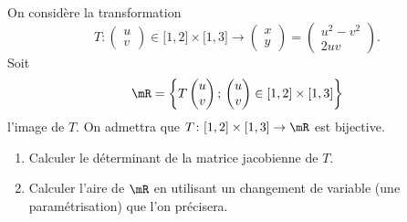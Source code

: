 
\begin{exercice}\label{exoOutilsMath-0119}

    On considère la transformation
    \begin{equation}
        T\colon \begin{pmatrix}
            u    \\ 
            v    
        \end{pmatrix}\in\mathopen[ 1 , 2 \mathclose]\times\mathopen[ 1 , 3 \mathclose]\to \begin{pmatrix}
            x    \\ 
            y    
        \end{pmatrix}=\begin{pmatrix}
            u^2-v^2    \\ 
            2uv    
        \end{pmatrix}.
    \end{equation}
    Soit
    \begin{equation}
        \mR=\left\{ T\begin{pmatrix}
            u    \\ 
            v    
        \end{pmatrix};\,\begin{pmatrix}
            u    \\ 
            v    
        \end{pmatrix}\in\mathopen[ 1 , 2 \mathclose]\times\mathopen[ 1 , 3 \mathclose]\right\}
    \end{equation}
    l'image de \( T\). On admettra que \( T\colon \mathopen[ 1 , 2 \mathclose]\times\mathopen[ 1 , 3 \mathclose]\to \mR\) est bijective.
    \begin{enumerate}
        \item
            Calculer le déterminant de la matrice jacobienne de \( T\).
        \item
            Calculer l'aire de \( \mR\) en utilisant un changement de variable (une paramétrisation) que l'on précisera.
    \end{enumerate}
    

\end{exercice}
